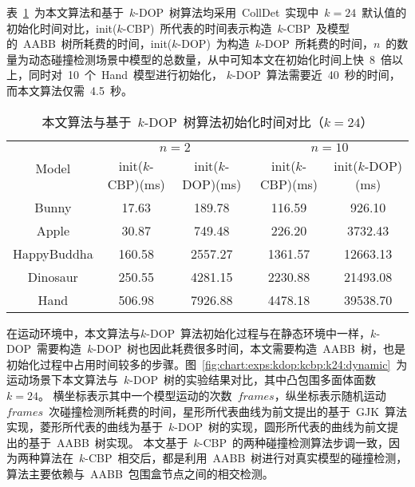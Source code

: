 表~\ref{tab:exper:kcbp:kdop:init:k24}~为本文算法和基于~$k$-DOP~树算法均采用~CollDet~实现中~$k=24$~默认值的初始化时间对比，init($k$-CBP)~所代表的时间表示构造~$k$-CBP~及模型
的~AABB~树所耗费的时间，init($k$-DOP)~为构造~$k$-DOP~所耗费的时间，$n$~的数量为动态碰撞检测场景中模型的总数量，从中可知本文在初始化时间上快~8~倍以上，同时对~10~个~Hand~模型进行初始化，
$k$-DOP~算法需要近~40~秒的时间，而本文算法仅需~4.5~秒。

\begin{table}[htbp]
\centering
\caption{本文算法与基于~$k$-DOP~树算法初始化时间对比（$k=24$）}
\label{tab:exper:kcbp:kdop:init:k24}
\begin{tabular}{ccccc}
\toprule[1.5pt]
\multirow{2}{*}{Model} & \multicolumn{2}{c}{$n=2$} &
\multicolumn{2}{c}{$n=10$}\\
\cmidrule(lr){2-3}\cmidrule(lr){4-5}
~&init($k$-CBP)(ms)&init($k$-DOP)(ms)& init($k$-CBP)(ms)&init($k$-DOP)(ms) \\
\midrule[1pt]
Bunny    &17.63  &189.78   &116.59 	  &926.10   	 \\
Apple    &30.87  &749.48   &226.20 	  &3732.43  	 \\
HappyBuddha	&160.58 	&2557.27 	&1361.57 	&12663.13  \\
Dinosaur &250.55 &4281.15  &2230.88	  &21493.08 	 \\
Hand	&506.98 &	7926.88 &	4478.18 &	39538.70 \\ 
\bottomrule[1.5pt]
\end{tabular}
\end{table}

在运动环境中，本文算法与$k$-DOP~算法初始化过程与在静态环境中一样，$k$-DOP~需要构造~$k$-DOP~树也因此耗费很多时间，本文需要构造~AABB~树，也是初始化过程中占用时间较多的步骤。图~\ref{fig:chart:exps:kdop:kcbp:k24:dynamic}~为运动场景下本文算法与~$k$-DOP~树的实验结果对比，其中凸包围多面体面数~$k=24$。
横坐标表示其中一个模型运动的次数~$frames$，纵坐标表示随机运动~$frames$~次碰撞检测所耗费的时间，星形所代表曲线为前文提出的基于~GJK~算法实现，菱形所代表的曲线为基于~$k$-DOP~树的实现，圆形所代表的曲线为前文提出的基于~AABB~树实现。
本文基于~$k$-CBP~的两种碰撞检测算法步调一致，因为两种算法在~$k$-CBP~相交后，都是利用~AABB~树进行对真实模型的碰撞检测，算法主要依赖与~AABB~包围盒节点之间的相交检测。

